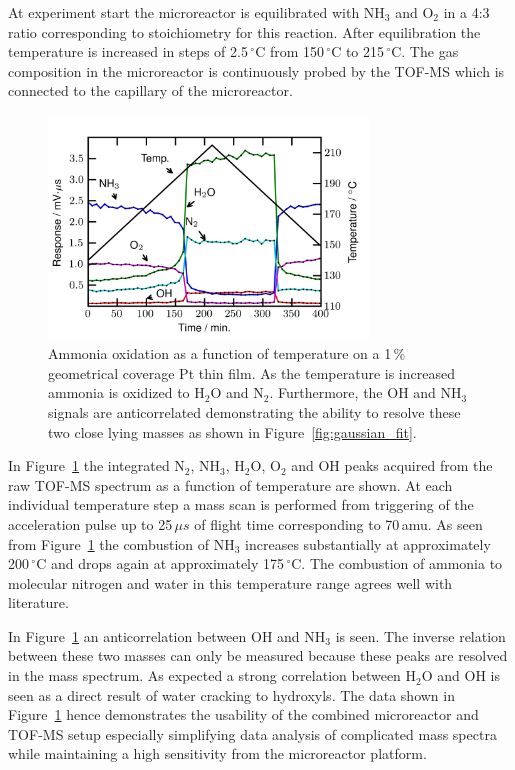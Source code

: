 \documentclass[aip,rsi]{revtex4-1}
\begin{document}
At experiment start the microreactor is equilibrated with NH$_3$ and O$_2$ in a 4:3 ratio corresponding to stoichiometry for this reaction. After equilibration the temperature is increased in steps of 2.5\,$^{\circ}$C from 150\,$^{\circ}$C to 215\,$^{\circ}$C. The gas composition in the microreactor is continuously probed by the TOF-MS which is connected to the capillary of the microreactor.
\begin{figure}
 \includegraphics[width=8.5cm]{ammonia_reactivity.png}%
 \caption{Ammonia oxidation as a function of temperature on a 1\,\% geometrical coverage Pt thin film. As the temperature is increased ammonia is oxidized to H$_2$O and N$_2$. Furthermore, the OH and NH$_3$ signals are anticorrelated demonstrating the ability to resolve these two close lying masses as shown in Figure~\ref{fig:gaussian_fit}.\label{fig:ammonia_reactivity}}%
\end{figure}
In Figure~\ref{fig:ammonia_reactivity} the integrated N$_2$, NH$_3$, H$_2$O, O$_2$ and OH peaks acquired from the raw TOF-MS spectrum as a function of temperature are shown. At each individual temperature step a mass scan is performed from triggering of the acceleration pulse up to 25\,$\mu s$ of flight time corresponding to 70\,amu. As seen from Figure~\ref{fig:ammonia_reactivity} the combustion of NH$_3$ increases substantially at approximately 200\,$^{\circ}$C and drops again at approximately 175\,$^{\circ}$C. The combustion of ammonia to molecular nitrogen and water in this temperature range agrees well with literature\cite{Imbihl2007,Zeng2009}. 

In Figure~\ref{fig:ammonia_reactivity} an anticorrelation between OH and NH$_3$ is seen. The inverse relation between these two masses can only be measured because these peaks are resolved in the mass spectrum. As expected a strong correlation between H$_2$O and OH is seen as a direct result of water cracking to hydroxyls. The data shown in Figure~\ref{fig:ammonia_reactivity} hence demonstrates the usability of the combined microreactor and TOF-MS setup especially simplifying data analysis of complicated mass spectra while maintaining a high sensitivity from the microreactor platform.
\end{document}
